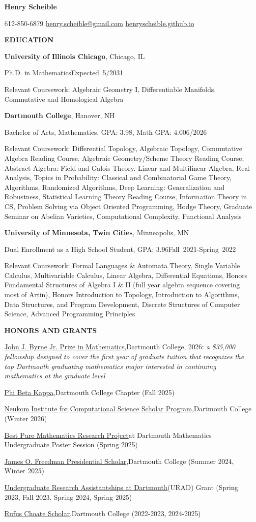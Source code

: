 \documentclass[letterpaper,11pt]{article}
\newcommand{\entrygap}{\par\addvspace{\baselineskip}}
\newcommand{\cvsection}[1]{\entrygap\textbf{\MakeUppercase{#1}}\par\nobreak\entrygap}
\newcommand{\institution}[2]{\textbf{#1}, #2\par\nobreak}
\newcommand{\datedline}[2]{#1\hfill\mbox{#2}\par\nobreak}
\newcommand{\award}[3][,]{\underline{#2}#1\space #3\par}
\newcommand{\contactlink}[2]{\href{#1}{\underline{#2}}}
\begin{document}
\fontsize{10.95pt}{14.55bp}\selectfont
\raggedright
{\centering
  \textbf{Henry Scheible}\par
  612-850-6879 \textbar{} \contactlink{mailto:henry.scheible@gmail.com}{henry.scheible@gmail.com} \textbar{}
  \contactlink{http://henryscheible.github.io}{henryscheible.github.io}\par
}

\cvsection{Education}
\institution{University of Illinois Chicago}{Chicago, IL}
\datedline{Ph.D. in Mathematics}{Expected 5/2031}
\entrygap
Relevant Coursework: Algebraic Geometry I, Differentiable Manifolds, Commutative and Homological Algebra

\entrygap


\institution{Dartmouth College}{Hanover, NH}
\datedline{Bachelor of Arts, Mathematics, GPA: 3.98, Math GPA: 4.00}{6/2026}

\entrygap
Relevant Coursework: Differential Topology, Algebraic Topology, Commutative Algebra Reading
Course, Algebraic Geometry/Scheme Theory Reading Course, Abstract Algebra: Field and Galois
Theory, Linear and Multilinear Algebra, Real Analysis, Topics in Probability: Classical and
Combinatorial Game Theory, Algorithms, Randomized Algorithms, Deep Learning: Generalization and
Robustness, Statistical Learning Theory Reading Course, Information Theory in CS, Problem
Solving via Object Oriented Programming, Hodge Theory, Graduate Seminar on Abelian Varieties,
Computational Complexity, Functional Analysis\par

\entrygap
\institution{University of Minnesota, Twin Cities}{Minneapolis, MN}
\datedline{Dual Enrollment as a High School Student, GPA: 3.96}{Fall 2021-Spring 2022}

\entrygap
Relevant Coursework: Formal Languages \& Automata Theory, Single Variable Calculus,
Multivariable Calculus, Linear Algebra, Differential Equations, Honors Fundamental Structures
of Algebra I \& II (full year algebra sequence covering most of Artin), Honors Introduction to
Topology, Introduction to Algorithms, Data Structures, and Program Development, Discrete
Structures of Computer Science, Advanced Programming Principles\par

\cvsection{Honors and Grants}
\award{John J. Byrne Jr. Prize in Mathematics}{Dartmouth College, 2026: \textit{a \$35,000 fellowship designed to cover the first year of graduate tuition that recognizes the top Dartmouth graduating mathematics major interested in continuing mathematics at the graduate level}}
\award{Phi Beta Kappa}{Dartmouth College Chapter (Fall 2025)}
\award{Neukom Institute for Computational Science Scholar Program}{Dartmouth College (Winter 2026)}
\award[]{Best Pure Mathematics Research Project}{at Dartmouth Mathematics Undergraduate Poster Session (Spring 2025)}
\award{James O. Freedman Presidential Scholar}{Dartmouth College (Summer 2024, Winter 2025)}
\award[]{Undergraduate Research Assistantships at Dartmouth}{(URAD) Grant (Spring 2023, Fall 2023, Spring 2024, Spring 2025)}
\award{Rufus Choate Scholar}{Dartmouth College (2022-2023, 2024-2025)}
\end{document}
